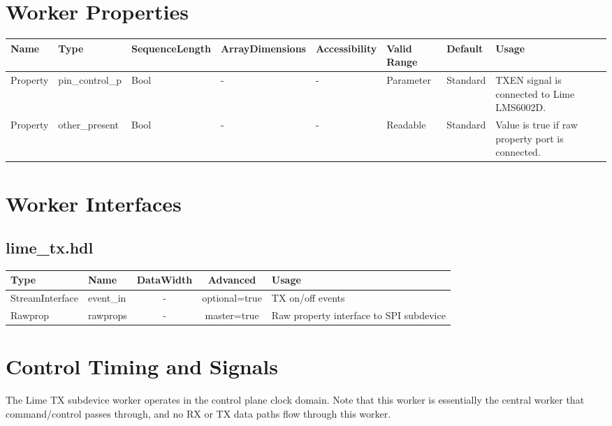 \documentclass{article}
\def\comp{lime\_tx}
\def\Comp{Lime TX}
\begin{document}
\begin{landscape}
  \section*{Worker Properties}
  \begin{scriptsize}
    \begin{tabular}{|p{3.75cm}|p{1.25cm}|p{2cm}|p{2.75cm}|p{1.5cm}|p{1.5cm}|p{1cm}|p{6.74cm}|}
      \hline
      \rowcolor{blue}
      Name               & Type & SequenceLength & ArrayDimensions & Accessibility      & Valid Range & Default & Usage                                                                               \\
      \hline
      Property & pin\_control\_p 	& Bool 	& - 				& - 				& Parameter		& Standard 		& TXEN signal is connected to Lime LMS6002D. \\
      \hline
      Property & other\_present 	& Bool 	& - 				& - 				& Readable 		& Standard 		& Value is true if raw property port is connected. \\
      \hline
    \end{tabular}
  \end{scriptsize}

  \section*{Worker Interfaces}
  \subsection*{\comp.hdl}
	\begin{scriptsize}
		\begin{tabular}{|M{2cm}|M{1.5cm}|c|c|M{12cm}|}
			\hline
			Type            & Name 		& DataWidth & Advanced   	& Usage                                    	\\
			\hline
			StreamInterface & event\_in & -        	& optional=true	& TX on/off events							\\
			\hline
			Rawprop 		& rawprops  & -       	& master=true   & Raw property interface to SPI subdevice	\\
			\hline
		\end{tabular}
	\end{scriptsize}

\end{landscape}

\section*{Control Timing and Signals}
The \Comp{} subdevice worker operates in the control plane clock domain. Note that this worker is essentially the central worker that command/control passes through, and no RX or TX data paths flow through this worker.
\end{document}
